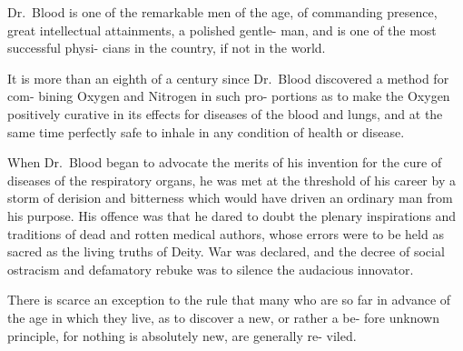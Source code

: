 \documentclass[10pt]{article}
\begin{document}
\begin{multicols}{3}
	Dr.~Blood is one of the remarkable men\linebreak
	of the age, of commanding presence, great\linebreak
	intellectual attainments, a polished gentle-\linebreak
	man, and is one of the most successful physi-\linebreak
	cians in the country, if not in the world.

	It is more than an eighth of a century\linebreak
	since Dr.~Blood discovered a method for com-\linebreak
	bining Oxygen and Nitrogen in such pro-\linebreak
	portions as to make the Oxygen positively curative in its effects for diseases\linebreak
	of the blood and lungs, and at the same time perfectly safe to inhale in any\linebreak
	condition of health or disease.

	When Dr.~Blood began to advocate the merits of his invention for the\linebreak
	cure of diseases of the respiratory organs, he was met at the threshold of his\linebreak
	career by a storm of derision and bitterness which would have driven an\linebreak
	ordinary man from his purpose. His offence was that he dared to doubt\linebreak
	the plenary inspirations and traditions of dead and rotten medical authors,\linebreak
	whose errors were to be held as sacred as the living truths of Deity. War\linebreak
	was declared, and the decree of social ostracism and defamatory rebuke was\linebreak
	to silence the audacious innovator.\columnbreak

	There is scarce an exception to the rule that many who are so far in\linebreak
	advance of the age in which they live, as to discover a new, or rather a be-\linebreak
	fore unknown principle, for nothing is absolutely new, are generally re-\linebreak
	viled.


\end{multicols}
\end{document}
